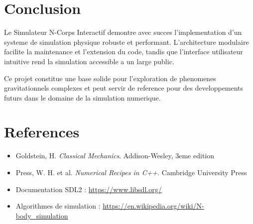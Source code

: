 \documentclass[12pt,a4paper]{article}
\begin{document}
\section{Conclusion}

Le Simulateur N-Corps Interactif demontre avec succes l'implementation d'un systeme de simulation physique robuste et performant. L'architecture modulaire facilite la maintenance et l'extension du code, tandis que l'interface utilisateur intuitive rend la simulation accessible a un large public.

Ce projet constitue une base solide pour l'exploration de phenomenes gravitationnels complexes et peut servir de reference pour des developpements futurs dans le domaine de la simulation numerique.

\section{References}

\begin{itemize}
    \item Goldstein, H. \textit{Classical Mechanics}. Addison-Wesley, 3eme edition
    \item Press, W. H. et al. \textit{Numerical Recipes in C++}. Cambridge University Press
    \item Documentation SDL2 : \url{https://www.libsdl.org/}
    \item Algorithmes de simulation : \url{https://en.wikipedia.org/wiki/N-body_simulation}
\end{itemize}
\end{document}
